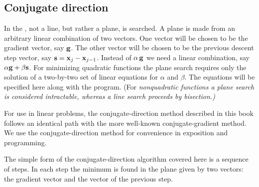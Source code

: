 \subsection{Conjugate direction}
In the , not a line, but rather a plane,
is searched.
A plane is made from an arbitrary linear combination of two vectors.
One vector will be chosen to be the gradient vector, say  $\bold g$.
The other vector will be chosen to be the previous descent step vector,
say  $\bold s = \bold x_j - \bold x_{j-1}$.
Instead of  $\alpha \, \bold g$  we need a linear combination,
say  $\alpha \bold g + \beta  \bold s$.
For minimizing quadratic functions the plane search requires
only the solution of a two-by-two set of linear equations
for  $\alpha$  and  $\beta$.
The equations will be specified here along with the program.
(For %
\it nonquadratic %
\rm functions a plane search is considered intractable,
whereas a line search proceeds by bisection.)
\par
For use in linear problems,
the conjugate-direction method described in this book
follows an identical path with the more well-known conjugate-gradient method.
We use the conjugate-direction method
for convenience in exposition and programming.

\par
        The simple form of the conjugate-direction algorithm covered here
        is a sequence of steps.
        In each step the minimum is found in the plane given by two vectors:
        the gradient vector and the vector of the previous step.


